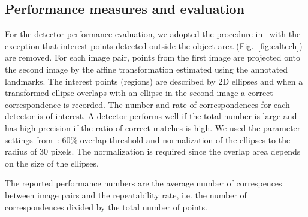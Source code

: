 \documentclass[10pt,journal,cspaper,compsoc]{IEEEtran}
\begin{document}
%
\subsection{Performance measures and evaluation}
%
For the detector performance evaluation, we adopted the procedure in~\cite{MikTuySch:2005}
with the exception that
interest points detected outside the object area (Fig.~\ref{fig:caltech})
are removed.
%
For each image pair, points from the first image are projected onto the
second image by the
affine transformation estimated using the annotated landmarks.
The interest points (regions) are described by 2D ellipses and when a transformed
ellipse overlaps with an ellipse in the second image a correct correspondence
is recorded.
The number and rate of correspondences for each detector is of interest. A detector performs well
if the total number is large and has high precision if the ratio of correct matches is high.
We used the parameter settings
from~\cite{MikTuySch:2005}: 60\% overlap threshold and normalization of the ellipses to
the radius of 30 pixels. The normalization is required since the overlap area depends
on the size of the ellipses. %

The reported performance numbers are the average number of correspences between
image pairs and the repeatability rate, i.e. the number of correspondences divided
by the total number of points.
\end{document}
